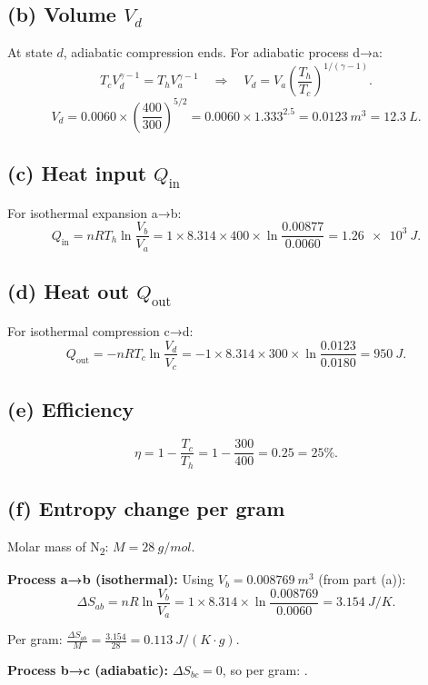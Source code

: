 \documentclass[11pt]{article}
\newcommand{\ans}[1]{\boxed{\displaystyle #1}}
\begin{document}
\subsection*{(b) Volume \(V_d\)}
At state \(d\), adiabatic compression ends. For adiabatic process d→a:
\[
T_c V_d^{\gamma-1} = T_h V_a^{\gamma-1}
\quad\Rightarrow\quad
V_d = V_a \left(\frac{T_h}{T_c}\right)^{1/(\gamma-1)}.
\]
\[
V_d = 0.0060 \times \left(\frac{400}{300}\right)^{5/2}
= 0.0060 \times 1.333^{2.5}
= \ans{\SI{0.0123}{m^3} = \SI{12.3}{L}}.
\]

\subsection*{(c) Heat input \(Q_{\text{in}}\)}
For isothermal expansion a→b:
\[
Q_{\text{in}} = nRT_h \ln\frac{V_b}{V_a}
= 1 \times 8.314 \times 400 \times \ln\frac{0.00877}{0.0060}
= \ans{\SI{1.26e3}{J}}.
\]

\subsection*{(d) Heat out \(Q_{\text{out}}\)}
For isothermal compression c→d:
\[
Q_{\text{out}} = -nRT_c \ln\frac{V_d}{V_c}
= -1 \times 8.314 \times 300 \times \ln\frac{0.0123}{0.0180}
= \ans{\SI{950}{J}}.
\]

\subsection*{(e) Efficiency}
\[
\eta = 1 - \frac{T_c}{T_h} = 1 - \frac{300}{400} = \ans{0.25 = 25\%}.
\]

\subsection*{(f) Entropy change per gram}
Molar mass of N\textsubscript{2}: \(M = \SI{28}{g/mol}\).

\textbf{Process a→b (isothermal):}
Using \(V_b = \SI{0.008769}{m^3}\) (from part (a)):
\[
\Delta S_{ab} = nR \ln\frac{V_b}{V_a} = 1 \times 8.314 \times \ln\frac{0.008769}{0.0060} = \SI{3.154}{J/K}.
\]

Per gram: \(\frac{\Delta S_{ab}}{M} = \frac{3.154}{28} = \ans{\SI{0.113}{J/(K\cdot g)}}\).

\textbf{Process b→c (adiabatic):} \(\Delta S_{bc} = 0\), so per gram: \ans{0}.
\end{document}
